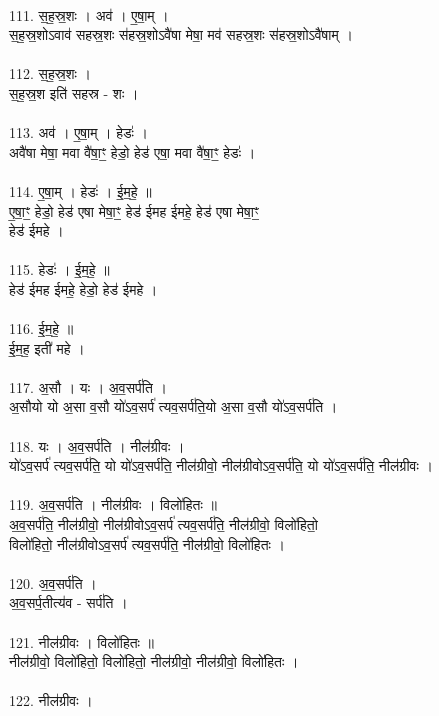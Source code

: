 \\
111. स॒ह॒स्र॒शः । अव॑ । ए॒षा॒म् ।\\
स॒ह॒स्र॒शोऽवाव॑ सहस्र॒शः स॑हस्र॒शोऽवै॑षा मेषा॒ मव॑ सहस्र॒शः स॑हस्र॒शोऽवै॑षाम् ।\\
\\
112. स॒ह॒स्र॒शः ।\\
स॒ह॒स्र॒श इति॑ सहस्र - शः ।\\
\\
113. अव॑ । ए॒षा॒म् । हेडः॑ ।\\
अवै॑षा मेषा॒ मवा वै॑षा॒ꣳ॒ हेडो॒ हेड॑ एषा॒ मवा वै॑षा॒ꣳ॒ हेडः॑ ।\\
\\
114. ए॒षा॒म् । हेडः॑ । ई॒म॒हे॒ ॥\\
ए॒षा॒ꣳ॒ हेडो॒ हेड॑ एषा मेषा॒ꣳ॒ हेड॑ ईमह ईमहे॒ हेड॑ एषा मेषा॒ꣳ॒\\
हेड॑ ईमहे ।\\
\\
115. हेडः॑ । ई॒म॒हे॒ ॥\\
हेड॑ ईमह ईमहे॒ हेडो॒ हेड॑ ईमहे ।\\
\\
116. ई॒म॒हे॒ ॥\\
ई॒म॒ह॒ इती॑ महे ।\\
\\
117. अ॒सौ । यः । अ॒व॒सर्प॑ति ।\\
अ॒सौयो यो अ॒सा व॒सौ यो॑ऽव॒सर्प॑ त्यव॒सर्प॑ति॒यो अ॒सा व॒सौ यो॑ऽव॒सर्प॑ति ।\\
\\
118. यः । अ॒व॒सर्प॑ति । नील॑ग्रीवः ।\\
यो॑ऽव॒सर्प॑ त्यव॒सर्प॑ति॒ यो यो॑ऽव॒सर्प॑ति॒ नील॑ग्रीवो॒ नील॑ग्रीवोऽव॒सर्प॑ति॒ यो यो॑ऽव॒सर्प॑ति॒ नील॑ग्रीवः ।\\
\\
119. अ॒व॒सर्प॑ति । नील॑ग्रीवः । विलो॑हितः ॥\\
अ॒व॒सर्प॑ति॒ नील॑ग्रीवो॒ नील॑ग्रीवोऽव॒सर्प॑ त्यव॒सर्प॑ति॒ नील॑ग्रीवो॒ विलो॑हितो॒\\
विलो॑हितो॒ नील॑ग्रीवोऽव॒सर्प॑ त्यव॒सर्प॑ति॒ नील॑ग्रीवो॒ विलो॑हितः ।\\
\\
120. अ॒व॒सर्प॑ति ।\\
अ॒व॒सर्प॒तीत्य॑व - सर्प॑ति ।\\
\\
121. नील॑ग्रीवः । विलो॑हितः ॥\\
नील॑ग्रीवो॒ विलो॑हितो॒ विलो॑हितो॒ नील॑ग्रीवो॒ नील॑ग्रीवो॒ विलो॑हितः ।\\
\\
122. नील॑ग्रीवः ।\\
